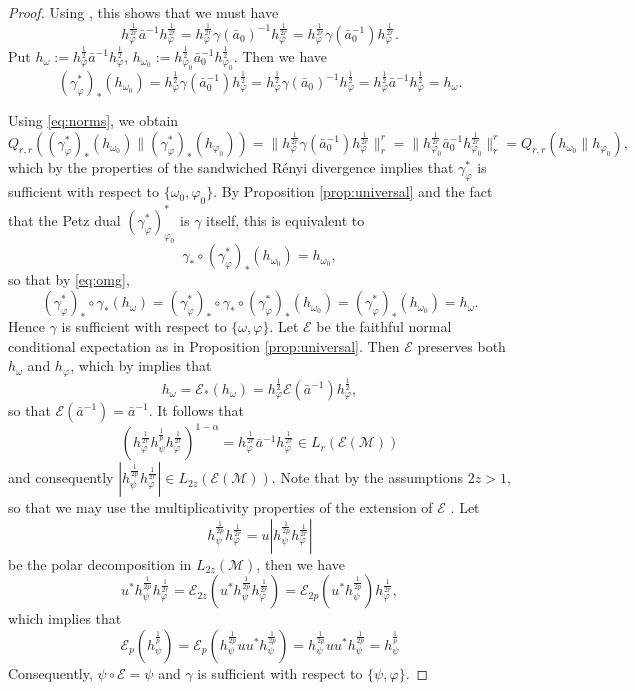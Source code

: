 \documentclass[12pt]{article}
\theoremstyle{definition}
\theoremstyle{remark}
\def\Me{\mathcal M}
\begin{document}
\begin{proof}
Using \cite[Lemma 5.1]{fack1986generalized}, this shows that we must have 
\[
h_\varphi^{\frac{1}{2r}}\bar a^{-1}h_\varphi^{\frac{1}{2r}}=
h_\varphi^{\frac{1}{2r}}\gamma(\bar a_0)^{-1}h_\varphi^{\frac{1}{2r}}=
h_\varphi^{\frac{1}{2r}}\gamma(\bar a_0^{-1})h_\varphi^{\frac{1}{2r}}.
\]
Put $h_\omega:= h_\varphi^{\frac{1}{2}} \bar a^{-1} h_\varphi^{\frac{1}{2}}$,
$h_{\omega_0}:=h_{\varphi_0}^{\frac{1}{2}} \bar a_0^{-1} h_{\varphi_0}^{\frac{1}{2}}$.
Then we have
\begin{equation}\label{eq:omg}
(\gamma_\varphi^*)_* (h_{\omega_0})=h_\varphi^{\frac{1}{2}}\gamma(\bar
a_0^{-1})h_\varphi^{\frac{1}{2}}=h_\varphi^{\frac{1}{2}}\gamma(\bar
a_0)^{-1}h_\varphi^{\frac{1}{2}}=h_\varphi^{\frac{1}{2}}\bar a^{-1}h_\varphi^{\frac{1}{2}}=h_\omega.
\end{equation}

Using \eqref{eq:norms}, we obtain
\[
Q_{r,r}((\gamma_\varphi^*)_*(h_{\omega_0})\|(\gamma_\varphi^*)_*(h_{\varphi_0}))=\|h_\varphi^{\frac{1}{2r}}\gamma(\bar a_0^{-1})h_\varphi^{\frac{1}{2r}}\|_r^r=\|h_{\varphi_0}^{\frac{1}{2r}}\bar
a_0^{-1}h_{\varphi_0}^{\frac{1}{2r}}\|_r^r=Q_{r,r}(h_{\omega_0}\|h_{\varphi_0}),
\]
which by the properties of the sandwiched R\'enyi divergence \cite[Thm.
]{jencova2018renyi} implies that $\gamma_\varphi^*$ is sufficient with respect to
$\{\omega_0,\varphi_0\}$. By Proposition \ref{prop:universal} and the fact that the
Petz dual  $(\gamma_\varphi^*)_{\varphi_0}^*$ is $\gamma$ itself, this  is equivalent to 
\[
\gamma_*\circ (\gamma_\varphi^*)_*(h_{\omega_0})=h_{\omega_0},
\]
so that  by \eqref{eq:omg},
\[
(\gamma_\varphi^*)_*\circ \gamma_*(h_\omega)=(\gamma_\varphi^*)_*\circ
\gamma_*\circ
(\gamma_\varphi^*)_*(h_{\omega_0})=(\gamma_\varphi^*)_*(h_{\omega_0})=h_\omega.
\]
Hence $\gamma$ is sufficient with respect to $\{\omega,\varphi\}$. Let $\mathcal E$ be the
faithful normal conditional expectation as in Proposition \ref{prop:universal}. Then
$\mathcal E$ preserves both $h_\omega$ and $h_\varphi$, which by
\cite{junge2003noncommutative} implies that 
\[
h_\omega=\mathcal E_*(h_\omega)=h_\varphi^{\frac{1}{2}}\mathcal E(\bar a^{-1}) h_\varphi^{\frac{1}{2}},
\]
so that $\mathcal E(\bar a^{-1})=\bar a^{-1}$. It follows that 
\[
\left(h_\varphi^{\frac{1}{2r}}h_\psi^{\frac{1}{p}}h_\varphi^{\frac{1}{2r}}\right)^{1-\alpha}=
h_\varphi^{\frac{1}{2r}}\bar a^{-1}h_\varphi^{\frac{1}{2r}}\in L_r(\mathcal E(\Me))
\]
and consequently $|h_\psi^{\frac{1}{2p}}h_\varphi^{\frac{1}{2r}}|\in L_{2z}(\mathcal E(\Me))$.
Note that by the assumptions $2z>1$, so that we may use the multiplicativity properties
of the extension of $\mathcal E$ \cite{junge2003noncommutative}. Let 
\[
h_\psi^{\frac{1}{2p}}h_\varphi^{\frac{1}{2r}}=u|h_\psi^{\frac{1}{2p}}h_\varphi^{\frac{1}{2r}}|
\]
be the polar decomposition in $L_{2z}(\Me)$, then we have 
\[
u^*h_\psi^{\frac{1}{2p}}h_\varphi^{\frac{1}{2r}}=\mathcal
E_{2z}(u^*h_\psi^{\frac{1}{2p}}h_\varphi^{\frac{1}{2r}})=\mathcal
E_{2p}(u^*h_\psi^{\frac{1}{2p}})h_\varphi^{\frac{1}{2r}},
\]
which implies that 
\[
\mathcal E_p(h_\psi^{\frac{1}p})=\mathcal
E_p(h_\psi^{\frac{1}{2p}}uu^*h_\psi^{\frac{1}{2p}})=h_\psi^{\frac{1}{2p}}uu^*h_\psi^{\frac{1}{2p}}=h_\psi^{\frac{1}{p}}
\]
Consequently, $\psi\circ\mathcal E=\psi$ and $\gamma$ is sufficient with respect to
$\{\psi,\varphi\}$. 



\end{proof}
\end{document}
